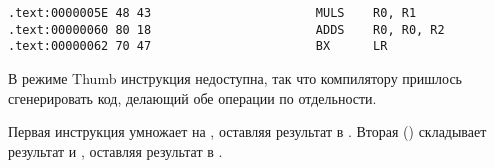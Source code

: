 \subsectionold{\OptimizingKeilVI (\ThumbMode)}

\begin{lstlisting}[label=ARM_leaf_example2]
.text:0000005E 48 43                       MULS    R0, R1
.text:00000060 80 18                       ADDS    R0, R0, R2
.text:00000062 70 47                       BX      LR
\end{lstlisting}

В режиме Thumb инструкция  недоступна, так что компилятору пришлось сгенерировать код, 
делающий обе операции по отдельности.

Первая инструкция  умножает  на , оставляя результат в .
Вторая () складывает результат и , оставляя результат в .

